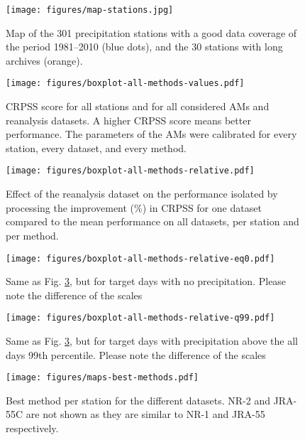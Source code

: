 \documentclass{ametsoc}
\begin{document}
\begin{figure}[t]
  \noindent\texttt{[image: figures/map-stations.jpg]}\\
  \caption{Map of the 301 precipitation stations with a good data coverage of the period 1981--2010 (blue dots), and the 30 stations with long archives (orange).}
	\label{fig:stations}
\end{figure}

\begin{figure}[t]
	\noindent\texttt{[image: figures/boxplot-all-methods-values.pdf]}\\
	\caption{CRPSS score for all stations and for all considered AMs and reanalysis datasets. A higher CRPSS score means better performance. The parameters of the AMs were calibrated for every station, every dataset, and every method.}
	\label{fig:comparison_values}
\end{figure}

\begin{figure}[t]
	\noindent\texttt{[image: figures/boxplot-all-methods-relative.pdf]}\\
	\caption{Effect of the reanalysis dataset on the performance isolated by processing the improvement (\%) in CRPSS for one dataset compared to the mean performance on all datasets, per station and per method.}
	\label{fig:comparison_relative}
\end{figure}

\begin{figure}[t]
	\noindent\texttt{[image: figures/boxplot-all-methods-relative-eq0.pdf]}\\
	\caption{Same as Fig. \ref{fig:comparison_relative}, but for target days with no precipitation. Please note the difference of the scales}
	\label{fig:comparison_relative_P0}
\end{figure}

\begin{figure}[t]
	\noindent\texttt{[image: figures/boxplot-all-methods-relative-q99.pdf]}\\
	\caption{Same as Fig. \ref{fig:comparison_relative}, but for target days with precipitation above the all days 99th percentile. Please note the difference of the scales}
	\label{fig:comparison_relative_Pq99}
\end{figure}

\begin{figure}[t]
	\noindent\texttt{[image: figures/maps-best-methods.pdf]}\\
	\caption{Best method per station for the different datasets. NR-2 and JRA-55C are not shown as they are similar to NR-1 and JRA-55 respectively.}
	\label{fig:map_best_methods}
\end{figure}
\end{document}
